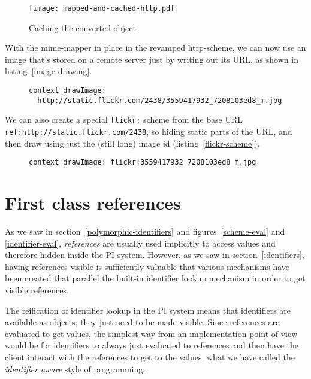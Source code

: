 \documentclass[preprint,authoryear]{acm_proc_article-sp}
\begin{document}
\begin{figure}[htbp]
\begin{center}
\texttt{[image: mapped-and-cached-http.pdf]}
\caption{Caching the converted object}
\label{http-converted-cached}
\end{center}
\end{figure}


With the mime-mapper in place in the revamped http-scheme, we can now use 
an image that's stored on a remote server just by writing out its URL, as shown
in listing~\ref{image-drawing}.

\begin{figure}[htbp]
\begin{lstlisting}[style=L,label=image-drawing,caption=Drawing a remote image via {\tt http:}.]
context drawImage: 
  http://static.flickr.com/2438/3559417932_7208103ed8_m.jpg
\end{lstlisting}
\end{figure}

We can also create a special {\tt flickr:} scheme from the base URL {\tt ref:http://static.flickr.com/2438},
so hiding static parts of the URL,
and then draw using just the (still long) image id (listing~\ref{flickr-scheme}).

\begin{figure}[htbp]
\begin{lstlisting}[style=L,label=flickr-scheme,caption=Drawing remote image via {\tt flickr:}]
context drawImage: flickr:3559417932_7208103ed8_m.jpg
\end{lstlisting}
\end{figure}


\section{First class references}
\label{references}


As we saw in section~\ref{polymorphic-identifiers} and figures~\ref{scheme-eval} and \ref{identifier-eval}, {\em references}
are usually used implicitly to access values and therefore hidden inside the PI system.  However,
as we saw in section~\ref{identifiers}, having references visible is sufficiently valuable that various
mechanisms have been created that parallel the built-in identifier lookup mechanism in order to
get visible references.

The reification of identifier lookup in the PI system means that identifiers are available as objects, 
they just need to be made visible.   Since references are evaluated to get values, the 
simplest way from an implementation point of view would be for identifiers to always just
evaluated to references and then have the client interact with the references to get to
the values, what we have called the {\em identifier aware} style of programming.
\end{document}

